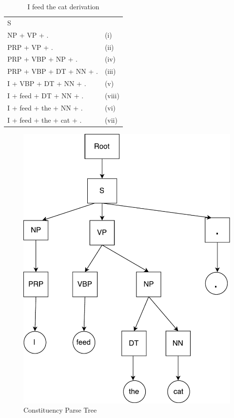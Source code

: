 
\begin{table}[H]
	\centering
	\begin{tabular}{ll}
	S	&  \\
	NP + VP + .	& (i) \\
	PRP + VP + .	& (ii) \\
	PRP + VBP + NP + .	& (iv)  \\
	PRP + VBP + DT + NN + .	& (iii) \\
	I + VBP + DT + NN + .	&  (v) \\
	I + feed + DT + NN + .	&  (viii) \\
	I + feed + the + NN + .	&  (vi) \\
	I + feed + the + cat + .	& (vii)
	\end{tabular}
\caption{I feed the cat derivation}
\label{ifeedmycat}
\end{table}

\begin{figure}[H]
    \centering
    \includegraphics[width=0.5\linewidth]{figure/ifeedthecatconstituency}
    \caption[Constituency Parse Tree]{Constituency Parse Tree}
    \label{fig:ifeedthecatconstituency}
\end{figure}

